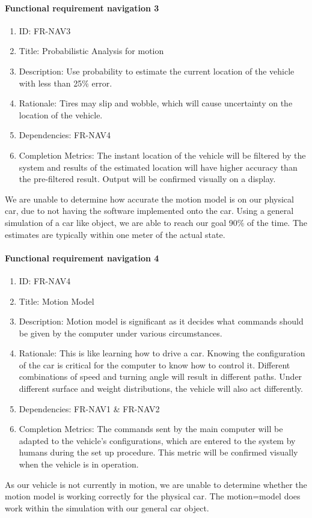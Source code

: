 \documentclass[compsoc,draftclsnofoot,onecolumn,10pt]{IEEEtran}
\begin{document}
	\paragraph{\textbf{Functional requirement navigation 3}}
		\begin{enumerate}
			\item ID: FR-NAV3
			\item Title: Probabilistic Analysis for motion
			\item Description: Use probability to estimate the current location of the vehicle with less than 25\% error.
			\item Rationale: Tires may slip and wobble, which will cause uncertainty on the location of the vehicle.
			\item Dependencies: FR-NAV4
			\item Completion Metrics: The instant location of the vehicle will be filtered by the system and results of the estimated location will have higher accuracy than the pre-filtered result. Output will be confirmed visually on a display. 
		\end{enumerate}
    We are unable to determine how accurate the motion model is on our physical car, due to not having the software implemented onto the car. 
    Using a general simulation of a car like object, we are able to reach our goal 90\% of the time. The estimates are typically within one meter of the actual state.
    
	\paragraph{\textbf{Functional requirement navigation 4}}
		\begin{enumerate}
			\item ID: FR-NAV4
			\item Title: Motion Model
			\item Description: Motion model is significant as it decides what commands should be given by the computer under various circumstances.
			\item Rationale: This is like learning how to drive a car. Knowing the configuration of the car is critical for the computer to know how to control it. Different combinations of speed and turning angle will result in different paths. Under different surface and weight distributions, the vehicle will also act differently.
			\item Dependencies: FR-NAV1 \& FR-NAV2
			\item Completion Metrics: The commands sent by the main computer will be adapted to the vehicle's configurations, which are entered to the system by humans during the set up procedure. 
			This metric will be confirmed visually when the vehicle is in operation.  
		\end{enumerate} 
    As our vehicle is not currently in motion, we are unable to determine whether the motion model is working correctly for the physical car. The motion=model does work within the simulation with our general car object.
    
\end{document}
